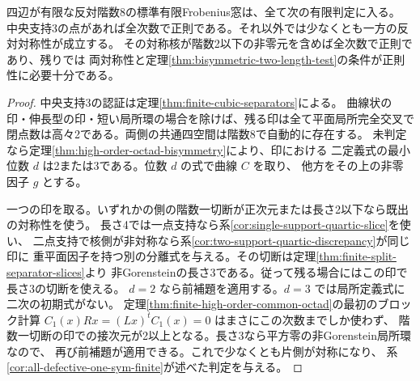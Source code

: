 \begin{theorem}\label{thm:finite-rank-eight-all-marks}
四辺が有限な反対階数8の標準有限Frobenius窓は、全て次の有限判定に入る。
中央支持3の点があれば全次数で正則である。それ以外では少なくとも一方の反対対称性が成立する。
その対称核が階数2以下の非零元を含めば全次数で正則であり、残りでは
両対称性と定理\ref{thm:bisymmetric-two-length-test}の条件が正則性に必要十分である。
\end{theorem}
\begin{proof}
中央支持3の認証は定理\ref{thm:finite-cubic-separators}による。
曲線状の印・伸長型の印・短い局所環の場合を除けば、残る印は全て平面局所完全交叉で
閉点数は高々2である。両側の共通四空間は階数8で自動的に存在する。
未判定なら定理\ref{thm:high-order-octad-bisymmetry}により、印における
二定義式の最小位数 $d$ は2または3である。位数 $d$ の式で曲線 $C$ を取り、
他方をその上の非零因子 $g$ とする。

一つの印を取る。いずれかの側の階数一切断が正次元または長さ2以下なら既出の対称性を使う。
長さ4では一点支持なら系\ref{cor:single-support-quartic-slice}を使い、
二点支持で核側が非対称なら系\ref{cor:two-support-quartic-discrepancy}が同じ印に
重平面因子を持つ別の分離式を与える。その切断は定理\ref{thm:finite-split-separator-slices}より
非Gorensteinの長さ3である。従って残る場合にはこの印で長さ3の切断を使える。
$d=2$ なら前補題を適用する。$d=3$ では局所定義式に二次の初期式がない。
定理\ref{thm:finite-high-order-common-octad}の最初のブロック計算
$C_1(x)Rx=(Lx)^t C_1(x)=0$ はまさにこの次数までしか使わず、
階数一切断の印での接次元が2以上となる。長さ3なら平方零の非Gorenstein局所環なので、
再び前補題が適用できる。これで少なくとも片側が対称になり、
系\ref{cor:all-defective-one-sym-finite}が述べた判定を与える。
\end{proof}
